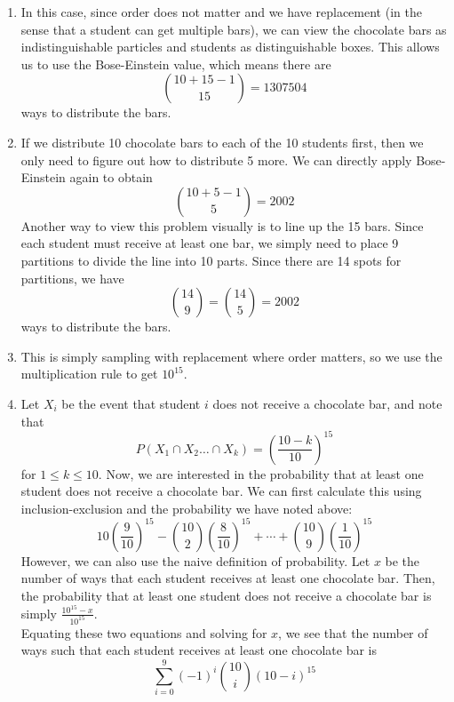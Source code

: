 \documentclass[11pt]{article}
\begin{document}
\begin{solution}{4}
\begin{enumerate}
    \item In this case, since order does not matter and we have replacement (in 
    the sense that a student can get multiple bars), we can view the chocolate
    bars as indistinguishable particles and students as distinguishable boxes.
    This allows us to use the Bose-Einstein value, which means there are
        $${10 + 15 -1 \choose 15} = 1307504$$
    ways to distribute the bars.
    \item If we distribute 10 chocolate bars to each of the 10 students first, then
    we only need to figure out how to distribute 5 more. We can directly apply
    Bose-Einstein again to obtain
        $${10 + 5 -1 \choose 5} = 2002$$
    Another way to view this problem visually is to line up the 15 bars. Since
    each student must receive at least one bar, we simply need to place 
    9 partitions to divide the line into 10 parts. Since there are 14 spots for
    partitions, we have 
        $${14 \choose 9} = {14 \choose 5} = 2002$$
    ways to distribute the bars.     
    \item This is simply sampling with replacement where order matters, 
    so we use the multiplication rule to get $10^{15}$.
    \item Let $X_i$ be the event that student $i$ does not receive a chocolate bar,
    and note that 
        $$P(X_1 \cap X_2 \dots \cap X_k) = \left(\frac{10-k}{10}\right)^{15}$$
    for $1 \leq k \leq 10$. Now, we are interested in the probability that at least
    one student does not receive a chocolate bar. We can first calculate this
    using inclusion-exclusion and the probability we have noted above:
        $$10\left(\frac{9}{10}\right)^{15} - {10 \choose 2}\left(\frac{8}{10}\right)^{15} + \dotsm + {10 \choose 9}\left(\frac{1}{10}\right)^{15}$$
    However, we can also use the naive definition of probability. Let $x$ be the number of ways that each student receives at least one chocolate bar. Then, the probability that at least one student does not receive a chocolate bar is simply $\frac{10^{15} - x}{10^{15}}$.\\
    
    Equating these two equations and solving for $x$, we see that the number of ways such that each student receives at least one chocolate bar is 
        $$\sum_{i=0}^9 (-1)^i {10 \choose i}(10-i)^{15}$$
\end{enumerate}
\end{solution}
\end{document}
